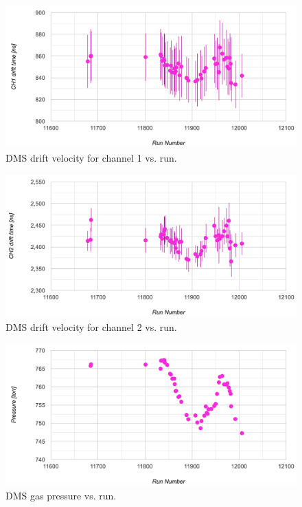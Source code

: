 \begin{figure}[h!]
	\centering
	\includegraphics[width=0.9\linewidth]{figures/DMS_ch1_run.png}
	\caption{DMS drift velocity for channel 1 vs. run.}
	\label{fig:dms_ch1_run}
\end{figure}
\begin{figure}[h!]
	\centering
	\includegraphics[width=0.9\linewidth]{figures/DMS_ch2_run.png}
	\caption{DMS drift velocity for channel 2 vs. run.}
	\label{fig:dms_ch2_run}
\end{figure}
\begin{figure}[h!]
	\centering
	\includegraphics[width=0.9\linewidth]{figures/DMS_pres_run.png}
	\caption{DMS gas pressure vs. run.}
	\label{fig:dms_pres_run}
\end{figure}

